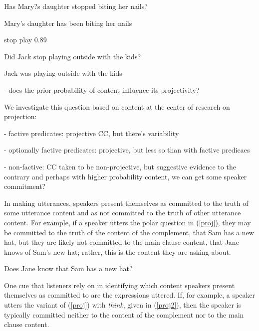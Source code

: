 \documentclass[11pt,fleqn]{article}
\newcommand{\6}{\mbox{$[\hspace*{-.6mm}[$}}
\newcommand{\9}{\mbox{$]\hspace*{-.6mm}]$}}
\begin{document}
Has Mary?s daughter stopped biting her nails?

Mary's daughter has been biting her nails

stop play 0.89

Did Jack stop playing outside with the kids?

Jack was playing outside with the kids


\newpage

- does the prior probability of content influence its projectivity?

We investigate this question based on content at the center of research on projection:

- factive predicates: projective CC, but there's variability

- optionally factive predicates: projective, but less so than with factive predicaes

- non-factive: CC taken to be non-projective, but suggestive evidence to the contrary and perhaps with higher probability content, we can get some speaker commitment?

\newpage

In making utterances, speakers present themselves as committed to the truth of some utterance content and as not committed to the truth of other utterance content. For example, if a speaker utters the polar question in (\ref{proj}), they may be committed to the truth of the content of the complement, that Sam has a new hat, but they are likely not committed to the main clause content, that Jane knows of Sam's new hat; rather, this is the content they are asking about.

\begin{exe}
\ex\label{proj} Does Jane know that Sam has a new hat?
\end{exe}
One cue that listeners rely on in identifying which content speakers present themselves as committed to are the expressions uttered. If, for example, a speaker utters the variant of (\ref{proj}) with {\em think}, given in (\ref{proj2}), then the speaker is typically committed neither to the content of the complement nor to the main clause content. 
\end{document}
